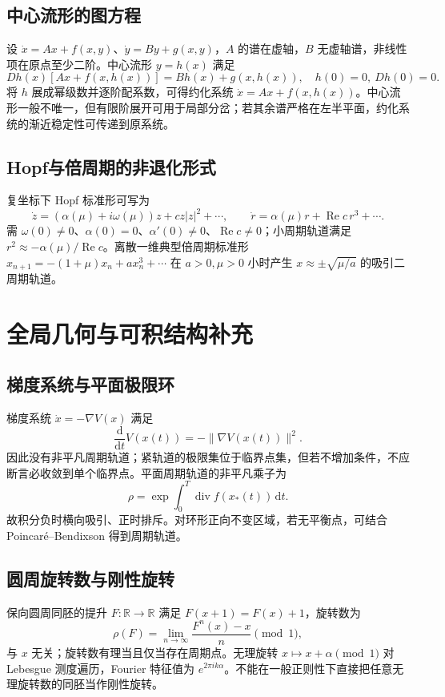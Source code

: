 \documentclass[../main.tex]{subfiles}
\begin{document}
\subsection{中心流形的图方程}
设 $\dot x=Ax+f(x,y)$、$\dot y=By+g(x,y)$，$A$ 的谱在虚轴，$B$ 无虚轴谱，非线性项在原点至少二阶。中心流形 $y=h(x)$ 满足
\[
Dh(x)[Ax+f(x,h(x))]=Bh(x)+g(x,h(x)),\quad h(0)=0,\ Dh(0)=0.
\]
将 $h$ 展成幂级数并逐阶配系数，可得约化系统 $\dot x=Ax+f(x,h(x))$。中心流形一般不唯一，但有限阶展开可用于局部分岔；若其余谱严格在左半平面，约化系统的渐近稳定性可传递到原系统。
\subsection{Hopf与倍周期的非退化形式}
复坐标下 Hopf 标准形可写为
\[
\dot z=(\alpha(\mu)+i\omega(\mu))z+c z|z|^2+\cdots,\qquad
\dot r=\alpha(\mu)r+\operatorname{Re}c\,r^3+\cdots.
\]
需 $\omega(0)\ne0$、$\alpha(0)=0$、$\alpha'(0)\ne0$、$\operatorname{Re}c\ne0$；小周期轨道满足 $r^2\approx-\alpha(\mu)/\operatorname{Re}c$。离散一维典型倍周期标准形 $x_{n+1}=-(1+\mu)x_n+ax_n^3+\cdots$ 在 $a>0,\mu>0$ 小时产生 $x\approx\pm\sqrt{\mu/a}$ 的吸引二周期轨道。
\section{全局几何与可积结构补充}
\subsection{梯度系统与平面极限环}
梯度系统 $\dot x=-\nabla V(x)$ 满足
\[
\frac{\mathrm d}{\mathrm dt}V(x(t))=-\|\nabla V(x(t))\|^2.
\]
因此没有非平凡周期轨道；紧轨道的极限集位于临界点集，但若不增加条件，不应断言必收敛到单个临界点。平面周期轨道的非平凡乘子为
\[
\rho=\exp\int_0^T\operatorname{div}f(x_*(t))\,\mathrm dt.
\]
故积分负时横向吸引、正时排斥。对环形正向不变区域，若无平衡点，可结合 Poincaré--Bendixson 得到周期轨道。
\subsection{圆周旋转数与刚性旋转}
保向圆周同胚的提升 $F:\mathbb R\to\mathbb R$ 满足 $F(x+1)=F(x)+1$，旋转数为
\[
\rho(F)=\lim_{n\to\infty}\frac{F^n(x)-x}{n}\pmod1,
\]
与 $x$ 无关；旋转数有理当且仅当存在周期点。无理旋转 $x\mapsto x+\alpha\pmod1$ 对 Lebesgue 测度遍历，Fourier 特征值为 $e^{2\pi ik\alpha}$。不能在一般正则性下直接把任意无理旋转数的同胚当作刚性旋转。
\end{document}
